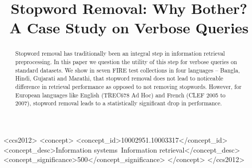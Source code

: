 \documentclass[sigconf]{acmart}
\begin{document}
\title{Stopword Removal: Why Bother? A Case Study on Verbose Queries}





\begin{abstract}
Stopword removal has traditionally been an integral step in information retrieval preprocessing. In this paper we question the utility of this step for verbose queries on standard datasets. We show in seven FIRE test collections in four languages -- Bangla, Hindi, Gujarati and Marathi, that stopword removal does not lead to noticeable difference in retrieval performance as opposed to not removing stopwords. However, for European languages like English (TREC678 Ad Hoc) and French (CLEF 2005 to 2007), stopword removal leads to a statistically significant drop in performance.
\end{abstract}

%
%
\begin{CCSXML}
<ccs2012>
<concept>
<concept_id>10002951.10003317</concept_id>
<concept_desc>Information systems~Information retrieval</concept_desc>
<concept_significance>500</concept_significance>
</concept>
</ccs2012>
\end{CCSXML}





\maketitle
%
%
%
%
%


 
\end{document}
